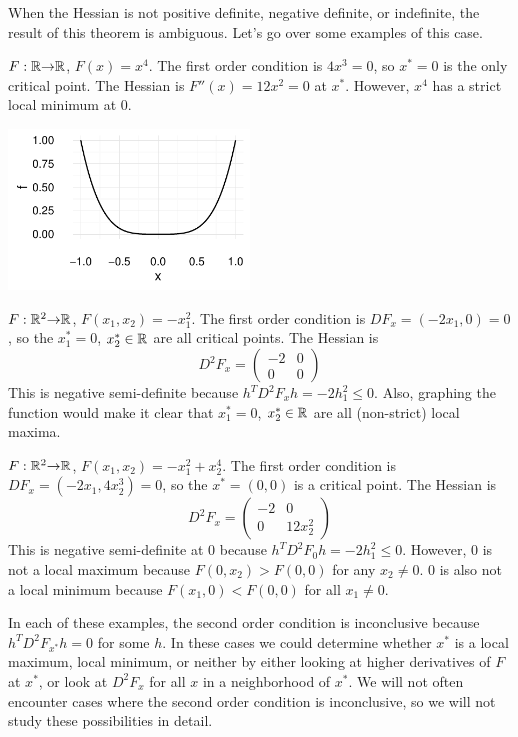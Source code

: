 When the Hessian is not positive definite, negative definite, or
indefinite, the result of this theorem is ambiguous. Let's go over
some examples of this case.
\begin{example}
  \begin{multicols}{2} 
    
  $F:\mathbb{R} {\rightarrow} \mathbb{R}$, $F(x) = x^4$. The first order condition is $4x^3 =
  0$, so $x^* = 0$ is the only critical point. The Hessian is $F''(x)
  = 12x^2 = 0$ at $x^*$. However, $x^4$ has a strict local minimum at
  $0$. 
  
  \columnbreak

  \includegraphics[width=0.48\textwidth]{ex21}
   
  \end{multicols}
\end{example}

\begin{example}
  $F: \mathbb{R}^2 {\rightarrow} \mathbb{R}$, $F(x_1,x_2) = -x_1^2$. The first order condition is
  $DF_x = (-2x_1,0) = 0$, so the $x_1^*=0$, $x_2^* \in \mathbb{R}$ are all
  critical points. The Hessian is
  \[ D^2 F_x = \begin{pmatrix} -2 & 0 \\
    0 & 0 \end{pmatrix} \]
  This is negative semi-definite because $h^T D^2 F_x h = -2 h_1^2
  \leq 0$. Also, graphing the function would make it clear that
  $x_1^*=0$, $x_2^* \in \mathbb{R}$ are all (non-strict) local maxima. 
\end{example}

\begin{example}
  $F: \mathbb{R}^2 {\rightarrow} \mathbb{R}$, $F(x_1,x_2) = -x_1^2 + x_2^4$. The first order
  condition is $DF_x = (-2x_1,4 x_2^3) = 0$, so the $x^* = (0,0)$ is a
  critical point. The Hessian is  
  \[ D^2 F_x = \begin{pmatrix} -2 & 0 \\
    0 & 12 x_2^2 \end{pmatrix} \]
  This is negative semi-definite at $0$ because $h^T D^2 F_0 h = -2 h_1^2
  \leq 0$. However, $0$ is not a local maximum because $F(0,x_2)>
  F(0,0)$ for any $x_2 \neq 0$. $0$ is also not a local minimum
  because $F(x_1,0) < F(0,0)$ for all $x_1 \neq 0$.
\end{example}
In each of these examples, the second order condition is inconclusive
because $h^T D^2 F_{x^*} h = 0$ for some $h$. In these cases we could
determine whether $x^*$ is a local maximum, local minimum, or neither
by either looking at higher derivatives of $F$ at $x^*$, or look at
$D^2 F_{x}$ for all $x$ in a neighborhood of $x^*$. We will not often
encounter cases where the second order condition is inconclusive, so
we will not study these possibilities in detail.


